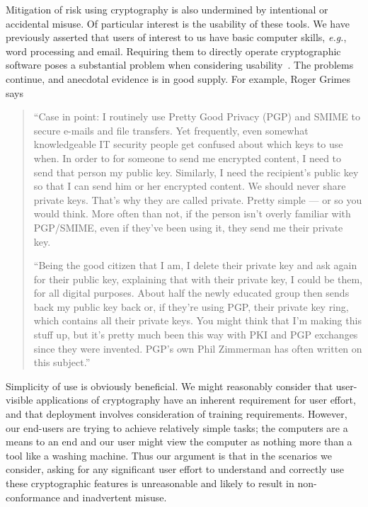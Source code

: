 \documentclass{article}
\def\cite{\citep}
\newcommand{\eg}{\textit{e.g.}}
\begin{document}
Mitigation of risk using cryptography is also undermined
by intentional or accidental misuse.  Of particular interest is the
usability of these tools.
We have previously asserted that  users of interest to us have basic
computer skills, \eg, word processing and email.  Requiring them to
directly operate cryptographic software poses a substantial problem when considering
usability~\cite{Whitten+05}.
The problems continue, and anecdotal evidence is in good supply.  For
example, Roger Grimes says
\begin{quote}
  ``Case in point: I routinely use Pretty Good Privacy (PGP) and SMIME
  to secure e-mails and file transfers. Yet frequently, even somewhat
  knowledgeable IT security people get confused about which keys to
  use when. In order to for someone to send me encrypted content, I
  need to send that person my public key. Similarly, I need the
  recipient's public key so that I can send him or her encrypted
  content. We should never share private keys. That's why they are
  called private. Pretty simple --- or so you would think. More often
  than not, if the person isn't overly familiar with PGP/SMIME, even
  if they've been using it, they send me their private key.


  ``Being the good citizen that I am, I delete their private key and
  ask again for their public key, explaining that with their private
  key, I could be them, for all digital purposes. About half the newly
  educated group then sends back my public key back or, if they're
  using PGP, their private key ring, which contains all their private
  keys. You might think that I'm making this stuff up, but it's pretty
  much been this way with PKI and PGP exchanges since they were
  invented. PGP's own Phil Zimmerman has often written on this
  subject.''~\cite{mGrimes09}
\end{quote}
Simplicity of use is obviously beneficial.  We might reasonably
consider that user-visible applications of cryptography have an inherent requirement
for user effort, and that deployment involves consideration of
training requirements.  However, our end-users are trying to achieve
relatively simple tasks; the computers are a means to an end and our
user might view the computer as nothing more than a tool like a
washing machine.  Thus our argument is that in the scenarios we
consider, asking for any significant user effort to understand and
correctly use these cryptographic features is unreasonable and likely
to result in non-conformance and inadvertent misuse.
\end{document}
